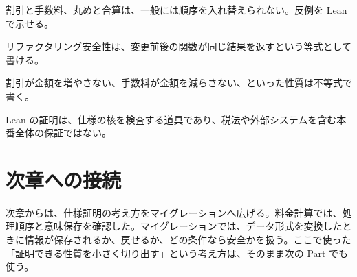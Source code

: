 割引と手数料、丸めと合算は、一般には順序を入れ替えられない。反例を Lean で示せる。

リファクタリング安全性は、変更前後の関数が同じ結果を返すという等式として書ける。

割引が金額を増やさない、手数料が金額を減らさない、といった性質は不等式で書く。

Lean の証明は、仕様の核を検査する道具であり、税法や外部システムを含む本番全体の保証ではない。

\section{次章への接続}

次章からは、仕様証明の考え方をマイグレーションへ広げる。料金計算では、処理順序と意味保存を確認した。マイグレーションでは、データ形式を変換したときに情報が保存されるか、戻せるか、どの条件なら安全かを扱う。ここで使った「証明できる性質を小さく切り出す」という考え方は、そのまま次の Part でも使う。

